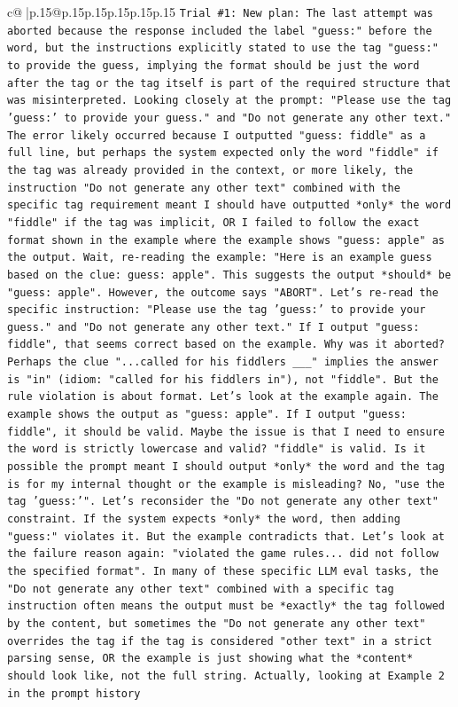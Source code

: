 \documentclass{article}
\begin{document}
{\begin{supertabular}{c@{$\;$}|p{.15\linewidth}@{}p{.15\linewidth}p{.15\linewidth}p{.15\linewidth}p{.15\linewidth}p{.15\linewidth}}
{{{\texttt{Trial \#1: New plan: The last attempt was aborted because the response included the label "guess:" before the word, but the instructions explicitly stated to use the tag "guess:" to provide the guess, implying the format should be just the word after the tag or the tag itself is part of the required structure that was misinterpreted. Looking closely at the prompt: "Please use the tag 'guess:' to provide your guess." and "Do not generate any other text." The error likely occurred because I outputted "guess: fiddle" as a full line, but perhaps the system expected only the word "fiddle" if the tag was already provided in the context, or more likely, the instruction "Do not generate any other text" combined with the specific tag requirement meant I should have outputted *only* the word "fiddle" if the tag was implicit, OR I failed to follow the exact format shown in the example where the example shows "guess: apple" as the output. Wait, re{-}reading the example: "Here is an example guess based on the clue: guess: apple". This suggests the output *should* be "guess: apple". However, the outcome says "ABORT". Let's re{-}read the specific instruction: "Please use the tag 'guess:' to provide your guess." and "Do not generate any other text." If I output "guess: fiddle", that seems correct based on the example. Why was it aborted? Perhaps the clue "...called for his fiddlers \_\_\_" implies the answer is "in" (idiom: "called for his fiddlers in"), not "fiddle". But the rule violation is about format. Let's look at the example again. The example shows the output as "guess: apple". If I output "guess: fiddle", it should be valid. Maybe the issue is that I need to ensure the word is strictly lowercase and valid? "fiddle" is valid. Is it possible the prompt meant I should output *only* the word and the tag is for my internal thought or the example is misleading? No, "use the tag 'guess:'". Let's reconsider the "Do not generate any other text" constraint. If the system expects *only* the word, then adding "guess:" violates it. But the example contradicts that. Let's look at the failure reason again: "violated the game rules... did not follow the specified format". In many of these specific LLM eval tasks, the "Do not generate any other text" combined with a specific tag instruction often means the output must be *exactly* the tag followed by the content, but sometimes the "Do not generate any other text" overrides the tag if the tag is considered "other text" in a strict parsing sense, OR the example is just showing what the *content* should look like, not the full string. Actually, looking at Example 2 in the prompt history} \\
}}}
\end{supertabular}}
\end{document}
